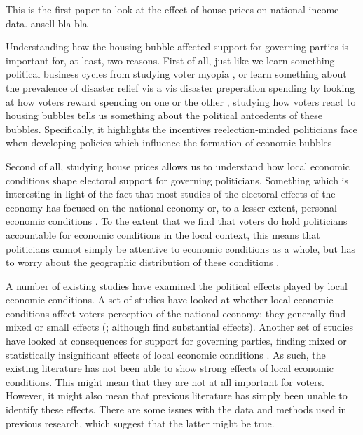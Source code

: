 \documentclass[12pt,a4paper]{article}
\begin{document}
This is the first paper to look at the effect of house prices on national income data. ansell bla bla


Understanding how the housing bubble affected support for governing parties is important for, at least, two reasons. First of all, just like we learn something political business cycles from studying voter myopia \citep{healy2014substituting,tufte1980political}, or learn something about the prevalence of disaster relief vis a vis disaster preperation spending by looking at how voters reward spending on one or the other \citep{healy2009myopic,ashworth2012electoral}, studying how voters react to housing bubbles tells us something about the political antcedents of these bubbles. Specifically, it highlights the incentives reelection-minded politicians face when developing policies which influence the formation of economic bubbles

Second of all, studying house prices allows us to understand how local economic conditions shape electoral support for governing politicians. Something which is interesting in light of the fact that most studies of the electoral effects of the economy has focused on the national economy or, to a lesser extent, personal economic conditions \citep[290]{healy2013retrospective}. To the extent that we find that voters do hold politicians accountable for economic conditions in the local context, this means that politicians cannot simply be attentive to economic conditions as a whole, but has to worry about the geographic distribution of these conditions \citep[cf.][11]{ferejohn1986incumbent}. 

A number of existing studies have examined the political effects played by local economic conditions. A set of studies have looked at whether local economic conditions affect voters perception of the national economy; they generally find mixed or small effects (\citealt{books1999contextual,reeves2012ecologies,anderson2011local,ansolabehere2014mecro}; although \citealt{dinesen2015reconsidering} find substantial effects). Another set of studies have looked at consequences for support for governing parties, finding mixed or statistically insignificant effects of local economic conditions \citep{hansford2015reevaluating,eisenberg2004economic,kim2003spatial}. As such, the existing literature has not been able to show strong effects of local economic conditions. This might mean that they are not at all important for voters. However, it might also mean that previous literature has simply been unable to identify these effects. There are some issues with the data and methods used in previous research, which suggest that the latter might be true.
\end{document}
